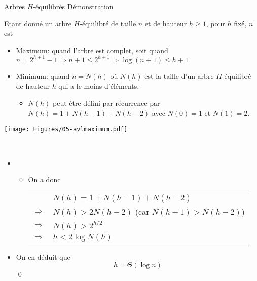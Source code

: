 \begin{frame}{Arbres $H$-équilibrés}
\alert{Démonstration}

Etant donné un arbre $H$-équilibré de taille $n$ et de hauteur $h\geq 1$, pour $h$ fixé, $n$ est
\begin{itemize}
\item Maximum: quand l'arbre est complet, soit quand
$n=2^{h+1}-1\Rightarrow n+1\leq 2^{h+1} \Rightarrow \log (n+1)\leq h+1$
\item Minimum: quand $n=N(h)$ où $N(h)$ est la taille d'un arbre $H$-équilibré de hauteur $h$ qui a le moins d'éléments.
\begin{itemize}
\item $N(h)$ peut être défini par récurrence par $N(h)=1+N(h-1)+N(h-2)$ avec $N(0)=1$ et $N(1)=2$.
\end{itemize}
\end{itemize}
\centerline{\texttt{[image: Figures/05-avlmaximum.pdf]}}
\end{frame}

\begin{frame}{~}%
\begin{itemize}
\item[]
\begin{itemize}
\item On a donc\\
\begin{tabular}{cl}
& $N(h)=1+N(h-1)+N(h-2)$\\
$\Rightarrow$ & $N(h)>2 N(h-2)$ (car $N(h-1)>N(h-2)$)\\
$\Rightarrow$ & $N(h)>2^{h/2}$\\
$\Rightarrow$ & $h< 2\log N(h)$\\
\end{tabular}
\end{itemize}
\item On en déduit que
$$h=\Theta(\log n)$$\qed
\end{itemize}

\end{frame}

